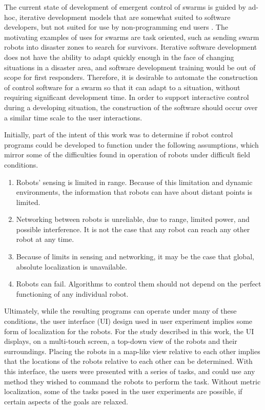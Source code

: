 The current state of development of emergent control of swarms is guided by ad-hoc, iterative development models that are somewhat suited to software developers, but not suited for use by non-programming end users \citep{palmer2005behavioral}.
The motivating examples of uses for swarms are task oriented, such as sending swarm robots into disaster zones to search for survivors.
Iterative software development does not have the ability to adapt quickly enough in the face of changing situations in a disaster area, and software development training would be out of scope for first responders. Therefore, it is desirable to automate the construction of control software for a swarm so that it can adapt to a situation, without requiring significant development time. 
In order to support interactive control during a developing situation, the construction of the software should occur over a similar time scale to the user interactions.

Initially, part of the intent of this work was to determine if robot control programs could be developed to function under the following assumptions, which mirror some of the difficulties found in operation of robots under difficult field conditions. 

\begin{enumerate}
	\item Robots' sensing is limited in range. Because of this limitation and dynamic environments, the information that robots can have about distant points is limited. 
	\item Networking between robots is unreliable, due to range, limited power, and possible interference. It is not the case that any robot can reach any other robot at any time.
	\item Because of limits in sensing and networking, it may be the case that global, absolute localization is unavailable. 
	\item Robots can fail. Algorithms to control them should not depend on the perfect functioning of any individual robot. 
\end{enumerate}

Ultimately, while the resulting programs can operate under many of these conditions, the user interface (UI) design used in user experiment implies some form of localization for the robots.
For the study described in this work, the UI displays, on a multi-touch screen, a top-down view of the robots and their surroundings. 
Placing the robots in a map-like view relative to each other implies that the locations of the robots relative to each other can be determined. 
With this interface, the users were presented with a series of tasks, and could use any method they wished to command the robots to perform the task. 
Without metric localization, some of the tasks posed in the user experiments are possible, if certain aspects of the goals are relaxed. 


